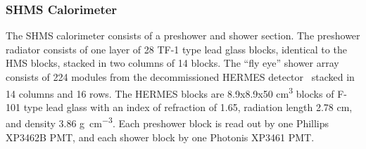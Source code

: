 \subsubsection{SHMS Calorimeter}
The SHMS calorimeter consists of a preshower and shower section.
The preshower radiator consists of one layer of 28 TF-1 type lead glass blocks,
identical to the HMS blocks, stacked in two columns of 14 blocks.
The ``fly eye'' shower array consists of 224 modules from the decommissioned
HERMES detector~\cite{Avakian_1998} stacked in 14 columns and 16 rows.
The HERMES blocks are 8.9x8.9x50 \si{\cm\cubed} blocks of F-101 type lead glass with
an index of refraction of 1.65, radiation length 2.78 \si{\cm}, and density
3.86 \si{\gram\per\cm\cubed}.
Each preshower block is read out by one Phillips XP3462B PMT, and each shower
block by one Photonis XP3461 PMT.
